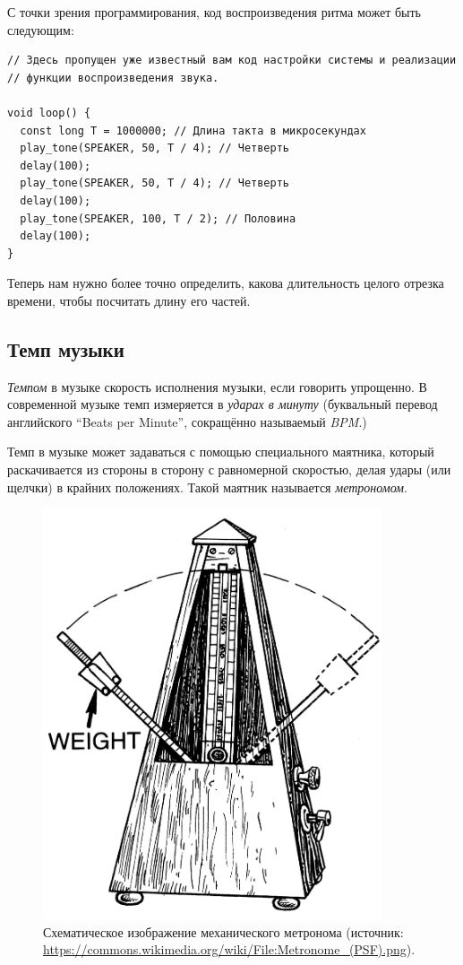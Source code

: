 \documentclass[a4paper,twoside]{book}
\begin{document}
С точки зрения программирования, код воспроизведения ритма может быть следующим:

\begin{verbatim}
// Здесь пропущен уже известный вам код настройки системы и реализации
// функции воспроизведения звука.

void loop() {
  const long T = 1000000; // Длина такта в микросекундах
  play_tone(SPEAKER, 50, T / 4); // Четверть
  delay(100);
  play_tone(SPEAKER, 50, T / 4); // Четверть
  delay(100);
  play_tone(SPEAKER, 100, T / 2); // Половина
  delay(100);
}
\end{verbatim}

Теперь нам нужно более точно определить, какова длительность целого отрезка
времени, чтобы посчитать длину его частей.

\subsection{Темп музыки}

\emph{Темпом} в музыке скорость исполнения музыки, если говорить упрощенно. В
современной музыке темп измеряется в \emph{ударах в минуту} (буквальный перевод
английского ``Beats per Minute'', сокращённо называемый \emph{BPM}.)

Темп в музыке может задаваться с помощью специального маятника, который
раскачивается из стороны в сторону с равномерной скоростью, делая удары (или
щелчки) в крайних положениях. Такой маятник называется \emph{метрономом}.

\begin{figure}[h]
  \caption{Схематическое изображение механического метронома (источник:
    \url{https://commons.wikimedia.org/wiki/File:Metronome_(PSF).png}).}
  \label{fig:sound-metronome}
  \includegraphics[width=10cm]{Metronome}
  \centering
\end{figure}
\end{document}
